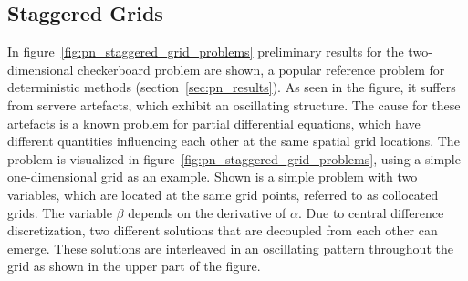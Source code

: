 \subsection{Staggered Grids}
\label{sec:pn_staggered}

In figure~\ref{fig:pn_staggered_grid_problems} preliminary results for the two-dimensional checkerboard problem are shown, a popular reference problem for deterministic methods (section~\ref{sec:pn_results}). As seen in the figure, it suffers from servere artefacts, which exhibit an oscillating structure. The cause for these artefacts is a known problem for partial differential equations, which have different quantities influencing each other at the same spatial grid locations. The problem is visualized in figure~\ref{fig:pn_staggered_grid_problems}, using a simple one-dimensional grid as an example. Shown is a simple problem with two variables, which are located at the same grid points, referred to as collocated grids. The variable $\beta$ depends on the derivative of $\alpha$. Due to central difference discretization, two different solutions that are decoupled from each other can emerge. These solutions are interleaved in an oscillating pattern throughout the grid as shown in the upper part of the figure.

